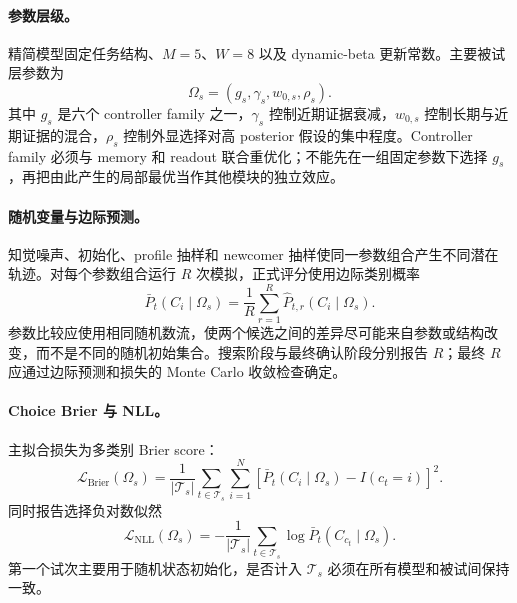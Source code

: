 \paragraph{参数层级。}
精简模型固定任务结构、$M=5$、$W=8$ 以及 dynamic-beta 更新常数。主要被试层参数为
\begin{equation}
    \Omega_s=(g_s,\gamma_s,w_{0,s},\rho_s).
    \label{eq:modelv2-subject-parameters}
\end{equation}
其中 $g_s$ 是六个 controller family 之一，$\gamma_s$ 控制近期证据衰减，$w_{0,s}$ 控制长期与近期证据的混合，$\rho_s$ 控制外显选择对高 posterior 假设的集中程度。Controller family 必须与 memory 和 readout 联合重优化；不能先在一组固定参数下选择 $g_s$，再把由此产生的局部最优当作其他模块的独立效应。

\paragraph{随机变量与边际预测。}
知觉噪声、初始化、profile 抽样和 newcomer 抽样使同一参数组合产生不同潜在轨迹。对每个参数组合运行 $R$ 次模拟，正式评分使用边际类别概率
\begin{equation}
    \bar P_t(C_i\mid\Omega_s)
    =
    \frac{1}{R}
    \sum_{r=1}^{R}
    \widehat P_{t,r}(C_i\mid\Omega_s).
    \label{eq:modelv2-marginal-choice}
\end{equation}
参数比较应使用相同随机数流，使两个候选之间的差异尽可能来自参数或结构改变，而不是不同的随机初始集合。搜索阶段与最终确认阶段分别报告 $R$；最终 $R$ 应通过边际预测和损失的 Monte Carlo 收敛检查确定。

\paragraph{Choice Brier 与 NLL。}
主拟合损失为多类别 Brier score：
\begin{equation}
    \mathcal L_{\mathrm{Brier}}(\Omega_s)
    =
    \frac{1}{|\mathcal T_s|}
    \sum_{t\in\mathcal T_s}
    \sum_{i=1}^{N}
    \left[
        \bar P_t(C_i\mid\Omega_s)-I(c_t=i)
    \right]^2 .
    \label{eq:modelv2-brier}
\end{equation}
同时报告选择负对数似然
\begin{equation}
    \mathcal L_{\mathrm{NLL}}(\Omega_s)
    =
    -\frac{1}{|\mathcal T_s|}
    \sum_{t\in\mathcal T_s}
    \log\bar P_t(C_{c_t}\mid\Omega_s).
    \label{eq:modelv2-nll}
\end{equation}
第一个试次主要用于随机状态初始化，是否计入 $\mathcal T_s$ 必须在所有模型和被试间保持一致。

